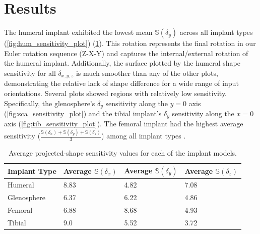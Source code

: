 \section{Results}
The humeral implant exhibited the lowest mean $\mathbb{S}(\delta_{y})$ across all implant types (\cref{fig:hum_sensitivity_plot}) (\cref{tab:ss-vals}).
This rotation represents the final rotation in our Euler rotation sequence (Z-X-Y) and captures the internal/external rotation of the humeral implant.
Additionally, the surface plotted by the humeral shape sensitivity for all $\delta_{x,y,z}$ is much smoother than any of the other plots, demonstrating the relative lack of shape difference for a wide range of input orientations.
Several plots showed regions with relatively low sensitivity.
Specifically, the glenosphere's $\delta_{y}$ sensitivity along the $y=0$ axis (\cref{fig:sca_sensitivity_plot}) and the tibial implant's $\delta_{y}$ sensitivity along the $x=0$ axis (\cref{fig:tib_sensitivity_plot}).
The femoral implant had the highest average sensitivity ($\frac{\mathbb{S}(\delta_{x}) +\mathbb{S}(\delta_{y}) +\mathbb{S}(\delta_{z})  }{3}$) among all implant types .


\begin{table}
	\caption{Average projected-shape sensitivity values for each of the implant models.} \label{tab:ss-vals}
	\begin{tabularx}{\linewidth}{|X|X|X|X|}\hline
		{\bf Implant Type} & Average $\mathbb{S}(\delta_{x})$ & Average  $\mathbb{S}(\delta_{y})$ & Average $\mathbb{S}(\delta_{z})$ \\ \hline
		Humeral            & 8.83                             & 4.82                              & 7.08                             \\\hline
		Glenosphere        & 6.37                             & 6.22                              & 4.86                             \\\hline
		Femoral            & 6.88                             & 8.68                              & 4.93                             \\\hline
		Tibial             & 9.0                              & 5.52                              & 3.72                             \\\hline
	\end{tabularx}
\end{table}


